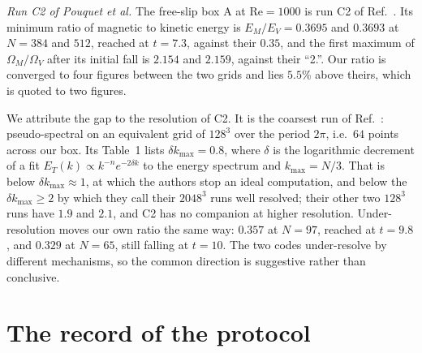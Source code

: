 \documentclass[aip,pop,reprint,amsmath,amssymb,superscriptaddress,floatfix]{revtex4-2}
\newcommand{\Rey}{\mathrm{Re}}
\begin{document}
\emph{Run C2 of Pouquet et al.} The free-slip box A at $\Rey=1000$ is run C2 of
Ref.~. Its minimum ratio of magnetic to kinetic energy is
$E_M/E_V=0.3695$ and $0.3693$ at $N=384$ and $512$, reached at $t=7.3$, against their
$0.35$, and the first maximum of $\Omega_M/\Omega_V$ after its initial fall is $2.154$
and $2.159$, against their ``2.''. Our ratio is converged to four figures between the
two grids and lies $5.5$\% above theirs, which is quoted to two figures.

We attribute the gap to the resolution of C2. It is the coarsest run of
Ref.~: pseudo-spectral on an equivalent grid of $128^3$ over
the period $2\pi$, i.e.\ $64$ points across our box. Its Table~1 lists
$\delta k_{\max}=0.8$, where $\delta$ is the logarithmic decrement of a fit
$E_T(k)\propto k^{-n}e^{-2\delta k}$ to the energy spectrum and $k_{\max}=N/3$. That is
below $\delta k_{\max}\approx1$, at which the authors stop an ideal computation, and
below the $\delta k_{\max}\ge2$ by which they call their $2048^3$ runs well resolved;
their other two $128^3$ runs have $1.9$ and $2.1$, and C2 has no companion at higher
resolution. Under-resolution moves our own ratio the same way: $0.357$ at $N=97$,
reached at $t=9.8$, and $0.329$ at $N=65$, still falling at $t=10$. The two codes
under-resolve by different mechanisms, so the common direction is suggestive rather
than conclusive.

\section{The record of the protocol}
\label{s:protocol}
\end{document}
